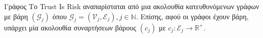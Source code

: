 {}
\begin{definitiongr}{Γράφος}
  Το \textlatin{Trust Is Risk} αναπαρίσταται από μια ακολουθία κατευθυνόμενων γράφων με βάρη $\left(\mathcal{G}_j\right)$ όπου
  $\mathcal{G}_j = \left(\mathcal{V}_j, \mathcal{E}_j\right), j \in \mathbb{N}$. Επίσης, αφού οι γράφοι έχουν βάρη, υπάρχει
  μία ακολουθία συναρτήσεων βάρους $\left(c_j\right)$ με $c_j : \mathcal{E}_j \rightarrow \mathbb{R}^{+}$.

\end{definitiongr}
